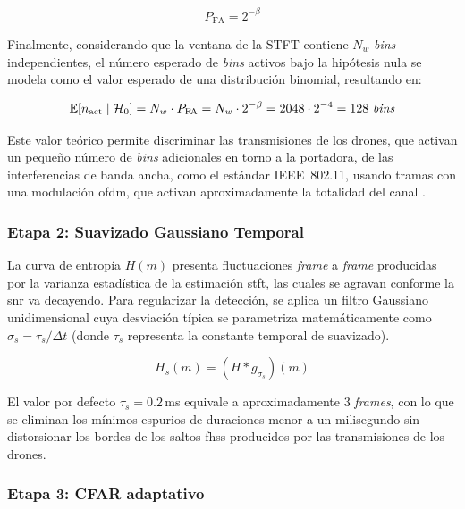 \begin{equation}
    P_{\text{FA}} = 2^{-\beta}
\end{equation}

Finalmente, considerando que la ventana de la STFT contiene $N_w$ \textit{bins} independientes, el número esperado de \textit{bins} activos bajo la hipótesis nula se modela como el valor esperado de una distribución binomial, resultando en:

\begin{equation}
    \mathbb{E}\!\left[n_{\text{act}} \mid \mathcal{H}_0\right] = N_w \cdot P_{\text{FA}} = N_w \cdot 2^{-\beta} = 2048 \cdot 2^{-4} = 128 \text{ \textit{bins}}
    \label{eq:bins_activos_ruido}
\end{equation}

Este valor teórico permite discriminar las transmisiones de los drones, que activan un pequeño número de \textit{bins} adicionales en torno a la portadora, de las interferencias de banda ancha, como el estándar IEEE~802.11, usando tramas con una modulación \gls{ofdm}, que activan aproximadamente la totalidad del canal \cite{ezuma_detection_2020}.

\subsubsection{Etapa 2: Suavizado Gaussiano Temporal}

La curva de entropía $H(m)$ presenta fluctuaciones \textit{frame} a \textit{frame} producidas por la varianza estadística de la estimación \gls{stft}, las cuales se agravan conforme la \gls{snr} va decayendo. Para regularizar la detección, se aplica un filtro Gaussiano unidimensional cuya desviación típica se parametriza matemáticamente como $\sigma_s = \tau_s / \Delta t$ (donde $\tau_s$ representa la constante temporal de suavizado).

\begin{equation}
    H_s(m) = \left(H * g_{\sigma_s}\right)(m)
    \label{eq:suavizado}
\end{equation}

El valor por defecto $\tau_s = 0.2$\,ms equivale a aproximadamente 3 \textit{frames}, con lo que se eliminan los mínimos espurios de duraciones menor a un milisegundo sin distorsionar los bordes de los saltos \gls{fhss} producidos por las transmisiones de los drones.

\subsubsection{Etapa 3: CFAR adaptativo}

